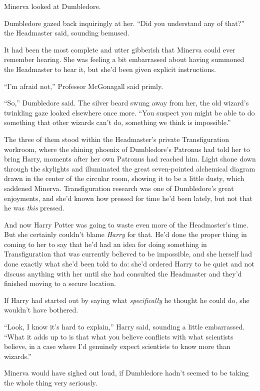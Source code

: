 Minerva looked at Dumbledore.

Dumbledore gazed back inquiringly at her. ``Did you understand any of
that?'' the Headmaster said, sounding bemused.

It had been the most complete and utter gibberish that Minerva could
ever remember hearing. She was feeling a bit embarrassed about having
summoned the Headmaster to hear it, but she'd been given explicit
instructions.

``I'm afraid not,'' Professor McGonagall said primly.

``So,'' Dumbledore said. The silver beard swung away from her, the old
wizard's twinkling gaze looked elsewhere once more. ``You suspect you
might be able to do something that other wizards can't do, something we
think is impossible.''

The three of them stood within the Headmaster's private Transfiguration
workroom, where the shining phoenix of Dumbledore's Patronus had told
her to bring Harry, moments after her own Patronus had reached him.
Light shone down through the skylights and illuminated the great
seven-pointed alchemical diagram drawn in the center of the circular
room, showing it to be a little dusty, which saddened Minerva.
Transfiguration research was one of Dumbledore's great enjoyments, and
she'd known how pressed for time he'd been lately, but not that he was
\emph{this} pressed.

And now Harry Potter was going to waste even more of the Headmaster's
time. But she certainly couldn't blame \emph{Harry} for that. He'd done
the proper thing in coming to her to say that he'd had an idea for doing
something in Transfiguration that was currently believed to be
impossible, and she herself had done exactly what she'd been told to do:
she'd ordered Harry to be quiet and not discuss anything with her until
she had consulted the Headmaster and they'd finished moving to a secure
location.

If Harry had started out by saying what \emph{specifically} he thought
he could do, she wouldn't have bothered.

``Look, I know it's hard to explain,'' Harry said, sounding a little
embarrassed. ``What it adds up to is that what you believe conflicts
with what scientists believe, in a case where I'd genuinely expect
scientists to know more than wizards.''

Minerva would have sighed out loud, if Dumbledore hadn't seemed to be
taking the whole thing very seriously.

